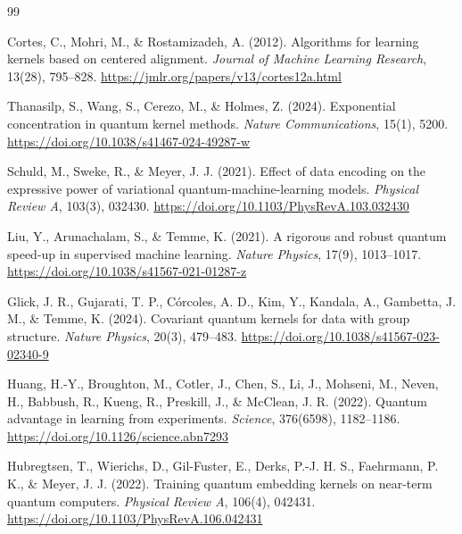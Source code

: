 \begin{thebibliography}{99}
  

    Cortes, C., Mohri, M., \& Rostamizadeh, A. (2012).
    Algorithms for learning kernels based on centered alignment.
    \textit{Journal of Machine Learning Research}, 13(28), 795--828.
    \url{https://jmlr.org/papers/v13/cortes12a.html}
% 

    Thanasilp, S., Wang, S., Cerezo, M., \& Holmes, Z. (2024).
    Exponential concentration in quantum kernel methods.
    \textit{Nature Communications}, 15(1), 5200.
    \url{https://doi.org/10.1038/s41467-024-49287-w}

    Schuld, M., Sweke, R., \& Meyer, J. J. (2021).
    Effect of data encoding on the expressive power of variational quantum-machine-learning models.
    \textit{Physical Review A}, 103(3), 032430.
    \url{https://doi.org/10.1103/PhysRevA.103.032430}

    Liu, Y., Arunachalam, S., \& Temme, K. (2021).
    A rigorous and robust quantum speed-up in supervised machine learning.
    \textit{Nature Physics}, 17(9), 1013--1017.
    \url{https://doi.org/10.1038/s41567-021-01287-z}

    Glick, J. R., Gujarati, T. P., C{\'{o}}rcoles, A. D., Kim, Y., Kandala, A., Gambetta, J. M., \& Temme, K. (2024).
    Covariant quantum kernels for data with group structure.
    \textit{Nature Physics}, 20(3), 479--483.
    \url{https://doi.org/10.1038/s41567-023-02340-9}

    Huang, H.-Y., Broughton, M., Cotler, J., Chen, S., Li, J., Mohseni, M., Neven, H., Babbush, R., Kueng, R., Preskill, J., \& McClean, J. R. (2022).
    Quantum advantage in learning from experiments.
    \textit{Science}, 376(6598), 1182--1186.
    \url{https://doi.org/10.1126/science.abn7293}

    Hubregtsen, T., Wierichs, D., Gil-Fuster, E., Derks, P.-J. H. S., Faehrmann, P. K., \& Meyer, J. J. (2022).
    Training quantum embedding kernels on near-term quantum computers.
    \textit{Physical Review A}, 106(4), 042431.
    \url{https://doi.org/10.1103/PhysRevA.106.042431}


\end{thebibliography}
